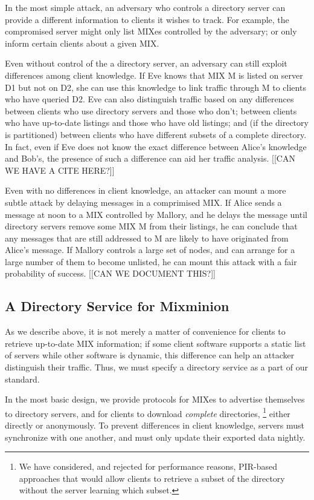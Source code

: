 \documentclass{llncs}
\begin{document}
In the most simple attack, an adversary who controls a directory
server can provide a different information to clients it wishes to
track.  For example, the compromised server might only list MIXes
controlled by the adversary; or only inform certain clients about a
given MIX. 

Even without control of the a directory server, an adversary can still
exploit differences among client knowledge.  If Eve knows that MIX M
is listed on server D1 but not on D2, she can use this knowledge to
link traffic through M to clients who have queried D2.  Eve can also
distinguish traffic based on any differences between clients who use
directory servers and those who don't; between clients who have
up-to-date listings and those who have old listings; and (if the
directory is partitioned) between clients who have different subsets
of a complete directory.  In fact, even if Eve does not know the exact
difference between Alice's knowledge and Bob's, the presence of such a
difference can aid her traffic analysis. [[CAN WE HAVE A CITE HERE?]]

Even with no differences in client knowledge, an attacker can mount a
more subtle attack by delaying messages in a comprimised MIX.  If
Alice sends a message at noon to a MIX controlled by Mallory, and he
delays the message until directory servers remove some MIX M from
their listings, he can conclude that any messages that are still
addressed to M are likely to have originated from Alice's message.  If
Mallory controls a large set of nodes, and can arrange for a large
number of them to become unlisted, he can mount this attack with a
fair probability of success. [[CAN WE DOCUMENT THIS?]]

\subsection{A Directory Service for Mixminion}
\label{subsec:dir-server-design}

As we describe above, it is not merely a matter of convenience for
clients to retrieve up-to-date MIX information; if some client
software supports a static list of servers while other software is
dynamic, this difference can help an attacker distinguish their
traffic.  Thus, we must specify a directory service as a part of our
standard.

In the most basic design, we provide protocols for MIXes to advertise
themselves to directory servers, and for clients to download
\emph{complete} directories,
  \footnote{We have considered, and rejected for performance reasons, 
            PIR-based \cite{PIR} approaches that would allow clients
            to retrieve a subset of the directory without the
            server learning which subset.} 
either directly or anonymously.  To prevent differences in client
knowledge, servers must synchronize with one another, and must only
update their exported data nightly.
\end{document}

